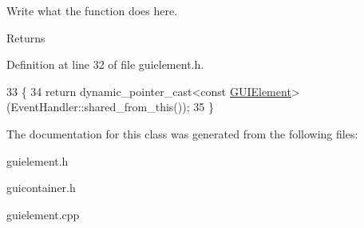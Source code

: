 Write what the function does here. 

\begin{DoxyReturn}{Returns}

\end{DoxyReturn}


Definition at line 32 of file guielement.\+h.


\begin{DoxyCode}
33         \{
34             \textcolor{keywordflow}{return} dynamic\_pointer\_cast<\textcolor{keyword}{const} \hyperlink{classGUIElement}{GUIElement}>(EventHandler::shared\_from\_this());
35         \}
\end{DoxyCode}


The documentation for this class was generated from the following files\+:\begin{DoxyCompactItemize}
\item 
guielement.\+h\item 
guicontainer.\+h\item 
guielement.\+cpp\end{DoxyCompactItemize}
